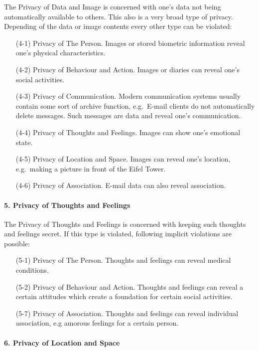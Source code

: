 The Privacy of Data and Image is concerned with one's data not being automatically available to others.
This also is a very broad type of privacy.
Depending of the data or image contents every other type can be violated:

\begin{itemize}

\item [(4-1)] Privacy of The Person.
  Images or stored biometric information reveal one's physical characteristics.
\item [(4-2)]Privacy of Behaviour and Action.
  Images or diaries can reveal one's social activities.
\item [(4-3)]Privacy of Communication.
  Modern communication systems usually contain some sort of archive function, e.g.~E-mail clients do not automatically delete messages.
  Such messages are data and reveal one's communication.
\item [(4-4)]Privacy of Thoughts and Feelings.
  Images can show one's emotional state.
\item [(4-5)]Privacy of Location and Space.
  Images can reveal one's location, e.g.~making a picture in front of the Eifel Tower.
\item [(4-6)]Privacy of Association. E-mail data can also reveal
  association.
\end{itemize}

\paragraph*{5. Privacy of Thoughts and Feelings}

The Privacy of Thoughts and Feelings is concerned with keeping such
thoughts and feelings secret. If this type is violated, following
implicit violations are possible:

\begin{itemize}
\item [(5-1)] Privacy of The Person.
  Thoughts and feelings can reveal medical conditions.
\item [(5-2)] Privacy of Behaviour and Action.
  Thoughts and feelings can reveal a certain attitudes which create a foundation for certain   social activities.
\item [(5-7)] Privacy of Association.
  Thoughts and feelings can reveal individual association, e.g amorous feelings for a certain person.
\end{itemize}

\paragraph*{6. Privacy of Location and Space}

